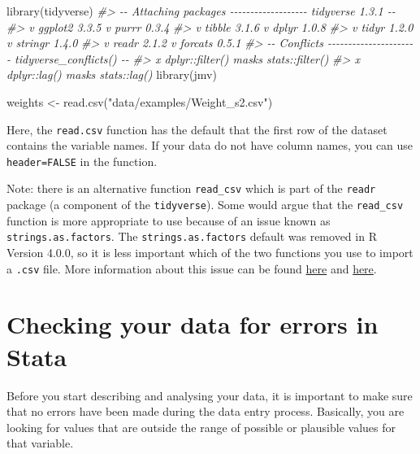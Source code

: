 \documentclass[
]{memoir}
\newenvironment{Shaded}{\begin{snugshade}}{\end{snugshade}}
\newcommand{\CommentTok}[1]{\textcolor[rgb]{0.56,0.35,0.01}{\textit{#1}}}
\newcommand{\FunctionTok}[1]{\textcolor[rgb]{0.00,0.00,0.00}{#1}}
\newcommand{\NormalTok}[1]{#1}
\newcommand{\OtherTok}[1]{\textcolor[rgb]{0.56,0.35,0.01}{#1}}
\newcommand{\StringTok}[1]{\textcolor[rgb]{0.31,0.60,0.02}{#1}}
\begin{document}
\begin{Shaded}
\begin{Highlighting}[]
\FunctionTok{library}\NormalTok{(tidyverse)}
\CommentTok{\#\textgreater{} {-}{-} Attaching packages {-}{-}{-}{-}{-}{-}{-}{-}{-}{-}{-}{-}{-}{-}{-}{-}{-}{-}{-} tidyverse 1.3.1 {-}{-}}
\CommentTok{\#\textgreater{} v ggplot2 3.3.5     v purrr   0.3.4}
\CommentTok{\#\textgreater{} v tibble  3.1.6     v dplyr   1.0.8}
\CommentTok{\#\textgreater{} v tidyr   1.2.0     v stringr 1.4.0}
\CommentTok{\#\textgreater{} v readr   2.1.2     v forcats 0.5.1}
\CommentTok{\#\textgreater{} {-}{-} Conflicts {-}{-}{-}{-}{-}{-}{-}{-}{-}{-}{-}{-}{-}{-}{-}{-}{-}{-}{-}{-}{-}{-} tidyverse\_conflicts() {-}{-}}
\CommentTok{\#\textgreater{} x dplyr::filter() masks stats::filter()}
\CommentTok{\#\textgreater{} x dplyr::lag()    masks stats::lag()}
\FunctionTok{library}\NormalTok{(jmv)}

\NormalTok{weights }\OtherTok{\textless{}{-}} \FunctionTok{read.csv}\NormalTok{(}\StringTok{"data/examples/Weight\_s2.csv"}\NormalTok{)}
\end{Highlighting}
\end{Shaded}

Here, the \texttt{read.csv} function has the default that the first row of the dataset contains the variable names. If your data do not have column names, you can use \texttt{header=FALSE} in the function.

Note: there is an alternative function \texttt{read\_csv} which is part of the \texttt{readr} package (a component of the \texttt{tidyverse}). Some would argue that the \texttt{read\_csv} function is more appropriate to use because of an issue known as \texttt{strings.as.factors}. The \texttt{strings.as.factors} default was removed in R Version 4.0.0, so it is less important which of the two functions you use to import a \texttt{.csv} file. More information about this issue can be found \href{https://simplystatistics.org/posts/2015-07-24-stringsasfactors-an-unauthorized-biography}{here} and \href{https://developer.r-project.org/Blog/public/2020/02/16/stringsasfactors/}{here}.

\hypertarget{checking-your-data-for-errors-in-stata}{%
\section{Checking your data for errors in Stata}\label{checking-your-data-for-errors-in-stata}}

Before you start describing and analysing your data, it is important to make sure that no errors have been made during the data entry process. Basically, you are looking for values that are outside the range of possible or plausible values for that variable.
\end{document}
